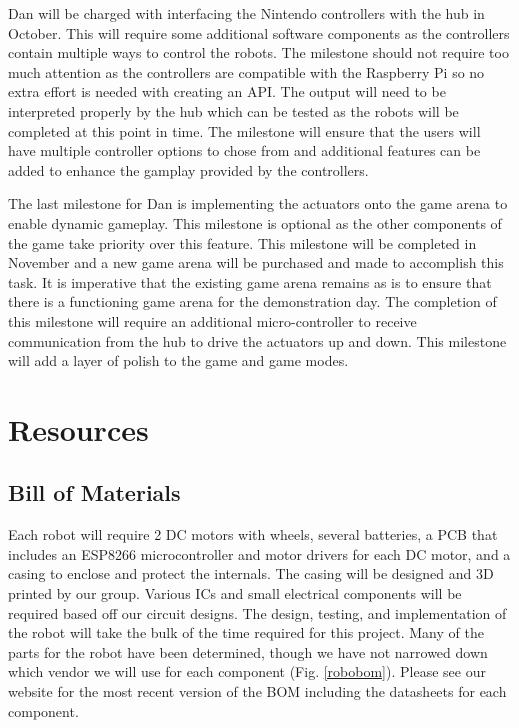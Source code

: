 \documentclass[11pt]{ieeeconf}
\begin{document}
Dan will be charged with interfacing the Nintendo controllers with the hub in October. This will require some additional software components as the controllers contain multiple ways to control the robots. The milestone should not require too much attention as the controllers are compatible with the Raspberry Pi so no extra effort is needed with creating an API. The output will need to be interpreted properly by the hub which can be tested as the robots will be completed at this point in time. The milestone will ensure that the users will have multiple controller options to chose from and additional features can be added to enhance the gamplay provided by the controllers.

The last milestone for Dan is implementing the actuators onto the game arena to enable dynamic gameplay. This milestone is optional as the other components of the game take priority over this feature. This milestone will be completed in November and a new game arena will be purchased and made to accomplish this task. It is imperative that the existing game arena remains as is to ensure that there is a functioning game arena for the demonstration day. The completion of this milestone will require an additional micro-controller to receive communication from the hub to drive the actuators up and down. This milestone will add a layer of polish to the game and game modes.

\section{Resources}
\subsection{Bill of Materials}

Each robot will require 2 DC motors with wheels, several batteries, a PCB that includes an ESP8266 microcontroller and motor drivers for each DC motor, and a casing to enclose and protect the internals. The casing will be designed and 3D printed by our group. Various ICs and small electrical components will be required based off our circuit designs. The design, testing, and implementation of the robot will take the bulk of the time required for this project. Many of the parts for the robot have been determined, though we have not narrowed down which vendor we will use for each component (Fig. \ref{robobom}). Please see our website for the most recent version of the BOM including the datasheets for each component.
\end{document}
